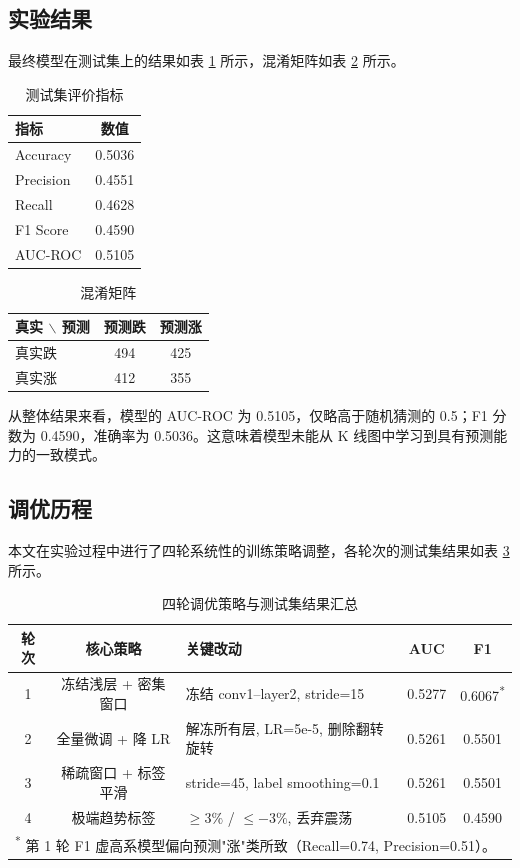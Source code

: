 \documentclass[12pt,a4paper]{ctexart}
\begin{document}
\subsection{实验结果}

最终模型在测试集上的结果如表 \ref{tab:test_results} 所示，混淆矩阵如表 \ref{tab:confusion} 所示。

\begin{table}[H]
\centering
\caption{测试集评价指标}
\label{tab:test_results}
\begin{tabular}{lc}
\toprule
\textbf{指标} & \textbf{数值} \\
\midrule
Accuracy  & 0.5036 \\
Precision & 0.4551 \\
Recall    & 0.4628 \\
F1 Score  & 0.4590 \\
AUC-ROC   & 0.5105 \\
\bottomrule
\end{tabular}
\end{table}

\begin{table}[H]
\centering
\caption{混淆矩阵}
\label{tab:confusion}
\begin{tabular}{lcc}
\toprule
\textbf{真实 $\backslash$ 预测} & \textbf{预测跌} & \textbf{预测涨} \\
\midrule
真实跌 & 494 & 425 \\
真实涨 & 412 & 355 \\
\bottomrule
\end{tabular}
\end{table}

从整体结果来看，模型的 AUC-ROC 为 0.5105，仅略高于随机猜测的 0.5；F1 分数为 0.4590，准确率为 0.5036。这意味着模型未能从 K 线图中学习到具有预测能力的一致模式。

\subsection{调优历程}

本文在实验过程中进行了四轮系统性的训练策略调整，各轮次的测试集结果如表 \ref{tab:tuning} 所示。

\begin{table}[H]
\centering
\caption{四轮调优策略与测试集结果汇总}
\label{tab:tuning}
\begin{tabular}{cclcc}
\toprule
\textbf{轮次} & \textbf{核心策略} & \textbf{关键改动} & \textbf{AUC} & \textbf{F1} \\
\midrule
1 & 冻结浅层 + 密集窗口 & 冻结 conv1--layer2, stride=15 & 0.5277 & 0.6067\textsuperscript{*} \\
2 & 全量微调 + 降 LR & 解冻所有层, LR=5e-5, 删除翻转旋转 & 0.5261 & 0.5501 \\
3 & 稀疏窗口 + 标签平滑 & stride=45, label smoothing=0.1 & 0.5261 & 0.5501 \\
4 & 极端趋势标签 & $\ge 3\%$ / $\le -3\%$, 丢弃震荡 & 0.5105 & 0.4590 \\
\bottomrule
\multicolumn{5}{l}{\footnotesize \textsuperscript{*} 第 1 轮 F1 虚高系模型偏向预测"涨"类所致（Recall=0.74, Precision=0.51）。} \\
\end{tabular}
\end{table}
\end{document}

